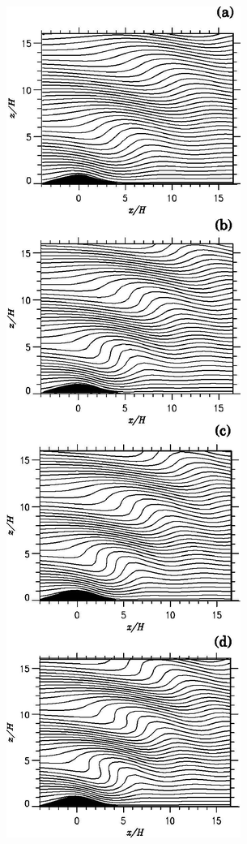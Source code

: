 \documentclass[11pt,letterpaper]{article}
\begin{document}
\begin{figure}
    \centering
    \includegraphics[scale=0.9]{fig/greene_sol}\hspace{1cm}

\end{figure}
\end{document}
